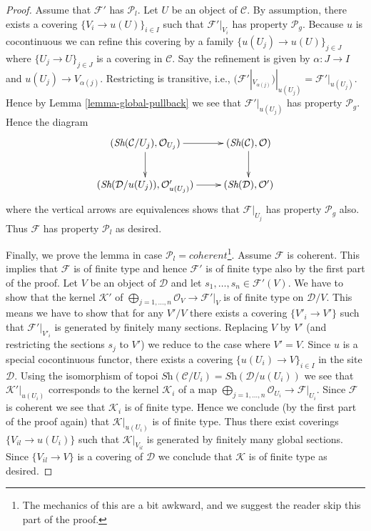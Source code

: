 \begin{proof}
\medskip\noindent
Assume that $\mathcal{F}'$ has $\mathcal{P}_l$.
Let $U$ be an object of $\mathcal{C}$.
By assumption, there exists a covering
$\{V_i \to u(U)\}_{i \in I}$ such that $\mathcal{F}'|_{V_i}$
has property $\mathcal{P}_g$. Because $u$ is cocontinuous we
can refine this covering by a family $\{u(U_j) \to u(U)\}_{j \in J}$
where $\{U_j \to U\}_{j \in J}$ is a covering in $\mathcal{C}$.
Say the refinement is given by $\alpha : J \to I$ and
$u(U_j) \to V_{\alpha(j)}$.
Restricting is transitive, i.e.,
$(\mathcal{F}'|_{V_{\alpha(j)}})|_{u(U_j)} = \mathcal{F}'|_{u(U_j)}$.
Hence by Lemma \ref{lemma-global-pullback} we see that
$\mathcal{F}'|_{u(U_j)}$ has property $\mathcal{P}_g$.
Hence the diagram
$$
\xymatrix{
(\textit{Sh}(\mathcal{C}/U_{j}), \mathcal{O}_{U_{j}}) \ar[r] \ar[d] &
(\textit{Sh}(\mathcal{C}), \mathcal{O}) \ar[d] \\
(\textit{Sh}(\mathcal{D}/u(U_{j})), \mathcal{O}'_{u(U_{j})})
\ar[r] &
(\textit{Sh}(\mathcal{D}), \mathcal{O}')
}
$$
where the vertical arrows are equivalences shows that $\mathcal{F}|_{U_j}$
has property $\mathcal{P}_g$ also. Thus $\mathcal{F}$ has
property $\mathcal{P}_l$ as desired.

\medskip\noindent
Finally, we prove the lemma in case
$\mathcal{P}_l = coherent$\footnote{The mechanics of this
are a bit awkward, and we suggest the reader skip this part of the proof.}.
Assume $\mathcal{F}$ is coherent. This implies that $\mathcal{F}$
is of finite type and hence $\mathcal{F}'$ is of finite type also by the
first part of the proof. Let $V$ be an object of $\mathcal{D}$ and let
$s_1, \ldots, s_n \in \mathcal{F}'(V)$. We have to show that the kernel
$\mathcal{K}'$ of
$\bigoplus_{j = 1, \ldots, n} \mathcal{O}_V \to \mathcal{F}'|_V$
is of finite type on $\mathcal{D}/V$. This means we have to show that
for any $V'/V$ there exists a covering $\{V'_i \to V'\}$ such that
$\mathcal{F}'|_{V'_i}$ is generated by finitely many sections.
Replacing $V$ by $V'$ (and restricting the sections $s_j$ to $V'$)
we reduce to the case where $V' = V$. Since $u$ is a special
cocontinuous functor, there exists a covering $\{u(U_i) \to V\}_{i \in I}$
in the site $\mathcal{D}$. Using the isomorphism of topoi
$\textit{Sh}(\mathcal{C}/U_i) = \textit{Sh}(\mathcal{D}/u(U_i))$
we see that $\mathcal{K}'|_{u(U_i)}$ corresponds to the kernel
$\mathcal{K}_i$ of a map
$\bigoplus_{j = 1, \ldots, n} \mathcal{O}_{U_i} \to \mathcal{F}|_{U_i}$.
Since $\mathcal{F}$ is coherent we see that $\mathcal{K}_i$
is of finite type. Hence we conclude (by the first part of the proof again)
that $\mathcal{K}|_{u(U_i)}$ is of finite type. Thus there exist coverings
$\{V_{il} \to u(U_i)\}$ such that $\mathcal{K}|_{V_{il}}$ is generated
by finitely many global sections. Since
$\{V_{il} \to V\}$ is a covering of $\mathcal{D}$ we conclude that
$\mathcal{K}$ is of finite type as desired.


\end{proof}
